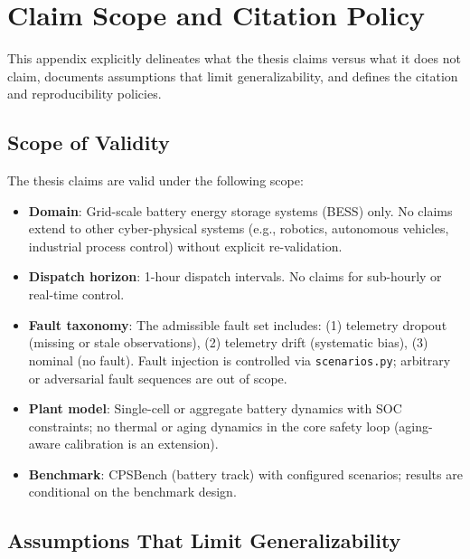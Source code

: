 \chapter{Claim Scope and Citation Policy}
\label{app:claim-scope-citation}

This appendix explicitly delineates what the thesis claims versus what it does not claim, documents assumptions that limit generalizability, and defines the citation and reproducibility policies.

\section{Scope of Validity}
\label{sec:scope-validity}

The thesis claims are valid under the following scope:

\begin{itemize}
\item \textbf{Domain}: Grid-scale battery energy storage systems (BESS) only. No claims extend to other cyber-physical systems (e.g., robotics, autonomous vehicles, industrial process control) without explicit re-validation.
\item \textbf{Dispatch horizon}: 1-hour dispatch intervals. No claims for sub-hourly or real-time control.
\item \textbf{Fault taxonomy}: The admissible fault set includes: (1) telemetry dropout (missing or stale observations), (2) telemetry drift (systematic bias), (3) nominal (no fault). Fault injection is controlled via \texttt{scenarios.py}; arbitrary or adversarial fault sequences are out of scope.
\item \textbf{Plant model}: Single-cell or aggregate battery dynamics with SOC constraints; no thermal or aging dynamics in the core safety loop (aging-aware calibration is an extension).
\item \textbf{Benchmark}: CPSBench (battery track) with configured scenarios; results are conditional on the benchmark design.
\end{itemize}

\section{Assumptions That Limit Generalizability}
\label{sec:assumptions}

